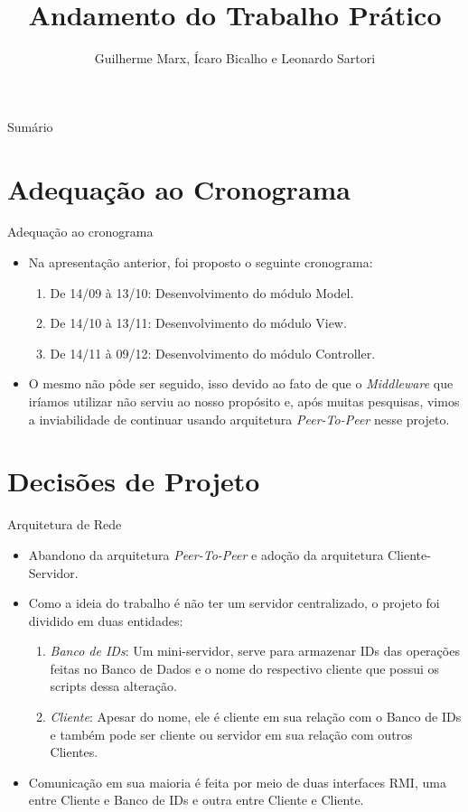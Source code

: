\documentclass[10pt,brazil]{beamer}
\title[Resumo]{Andamento do Trabalho Prático}
\author[ICEA - UFOP]{Guilherme Marx, Ícaro Bicalho e Leonardo Sartori}
\begin{document}
 	   \maketitle
		\begin{frame}{Sumário}
			\tableofcontents
		\end{frame}


\section{Adequação ao Cronograma}

\begin{frame}{Adequação ao cronograma}	
	\begin{itemize}
		\item Na apresentação anterior, foi proposto o seguinte cronograma:
		\begin{enumerate}
			\item De 14/09 à 13/10: \hfill Desenvolvimento do módulo Model.
			\item De 14/10 à 13/11: \hfill Desenvolvimento do módulo View.
			\item De 14/11 à 09/12: \hfill Desenvolvimento do módulo Controller.
		\end{enumerate}
		\item O mesmo não pôde ser seguido, isso devido ao fato de que o \emph{Middleware} que iríamos utilizar não serviu ao nosso propósito e, após muitas pesquisas, vimos a inviabilidade de continuar usando arquitetura \emph{Peer-To-Peer} nesse projeto.	
	\end{itemize}
\end{frame}

\section{Decisões de Projeto}
\begin{frame}{Arquitetura de Rede}
	\begin{itemize}
		\item Abandono da arquitetura \emph{Peer-To-Peer} e adoção da arquitetura Cliente-Servidor.
		\item Como a ideia do trabalho é não ter um servidor centralizado, o projeto foi dividido em duas entidades:
		
		\begin{enumerate}
			\item \emph{Banco de IDs}: Um mini-servidor, serve para armazenar IDs das operações feitas no Banco de Dados e o nome do respectivo cliente que possui os scripts dessa alteração.
			\item \emph{Cliente}: Apesar do nome, ele é cliente em sua relação com o Banco de IDs e também pode ser cliente ou servidor em sua relação com outros Clientes.
		\end{enumerate}
		\item Comunicação em sua maioria é feita por meio de duas interfaces RMI, uma entre Cliente e Banco de IDs e outra entre Cliente e Cliente.
	\end{itemize}
\end{frame}
\end{document}
